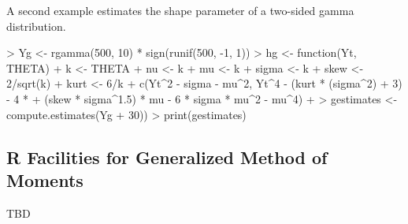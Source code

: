 A second example estimates the shape parameter of a two-sided gamma distribution.
\begin{Schunk}
\begin{Sinput}
> Yg <- rgamma(500, 10) * sign(runif(500, -1, 1))
> hg <- function(Yt, THETA) {
+     k <- THETA
+     nu <- k
+     mu <- k
+     sigma <- k
+     skew <- 2/sqrt(k)
+     kurt <- 6/k
+     c(Yt^2 - sigma - mu^2, Yt^4 - (kurt * (sigma^2) + 3) - 4 * 
+         (skew * sigma^1.5) * mu - 6 * sigma * mu^2 - mu^4)
+ }
> gestimates <- compute.estimates(Yg %o% 1, hg, interval = c(5, 
+     30))
> print(gestimates)
\end{Sinput}
\end{Schunk}
\subsection{R Facilities for Generalized Method of Moments}
TBD
